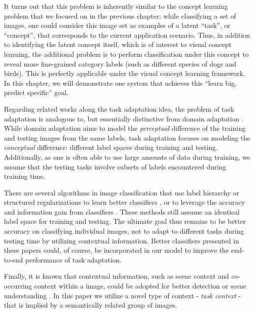 It turns out that this problem is inherently similar to the concept learning problem that we focused on in the previous chapter: while classifying a set of images, one could consider this image set as examples of a latent ``task'', or ``concept'', that corresponds to the current application scenario. Thus, in addition to identifying the latent concept itself, which is of interest to visual concept learning, the additional problem is to perform classification under this concept to reveal more fine-grained category labels (such as different species of dogs and birds). This is perfectly applicable under the visual concept learning framework. In this chapter, we will demonstrate one system that achieves this ``learn big, predict specific'' goal.

Regarding related works along the task adaptation idea, the problem of task adaptation is analogous to, but essentially distinctive from domain adaptation \cite{saenko2010adapting,kulis2011you}. While domain adaptation aims to model the \emph{perceptual} difference of the training and testing images from the same labels, task adaptation focuses on modeling the \emph{conceptual} difference: different label spaces during training and testing. Additionally, as one is often able to use large amounts of data during training, we assume that the testing tasks involve subsets of labels encountered during training time.


There are several algorithms in image classification that use label hierarchy or structured regularizations to learn better classifiers \cite{salakhutdinov2011learning,harchaoui2012large,gao2011discriminative}, or to leverage the accuracy and information gain from classifiers \cite{deng2012hedging}. These methods still assume an identical label space for training and testing. The ultimate goal thus remains to be better accuracy on classifying individual images, not to adapt to different tasks during testing time by utilizing contextual information. Better classifiers presented in these papers could, of course, be incorporated in our model to improve the end-to-end performance of task adaptation.

Finally, it is known that contextual information, such as scene context and co-occurring context within a image, could be adopted for better detection \cite{torralba2003contextual} or scene understanding \cite{li2009towards}. In this paper we utilize a novel type of context - \emph{task context} - that is implied by a semantically related group of images.


